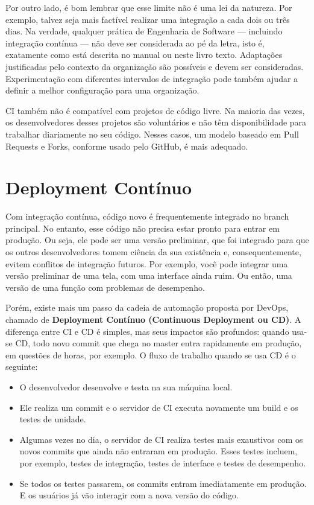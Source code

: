 \documentclass[
  11pt,
  twoside]{book}
\begin{document}
Por outro lado, é bom lembrar que esse limite não é uma lei da natureza.
Por exemplo, talvez seja mais factível realizar uma integração a cada
dois ou três dias. Na verdade, qualquer prática de Engenharia de
Software --- incluindo integração contínua --- não deve ser considerada
ao pé da letra, isto é, exatamente como está descrita no manual ou neste
livro texto. Adaptações justificadas pelo contexto da organização são
possíveis e devem ser consideradas. Experimentação com diferentes
intervalos de integração pode também ajudar a definir a melhor
configuração para uma organização.

CI também não é compatível com projetos de código livre. Na maioria das
vezes, os desenvolvedores desses projetos são voluntários e não têm
disponibilidade para trabalhar diariamente no seu código. Nesses casos,
um modelo baseado em Pull Requests e Forks, conforme usado pelo GitHub,
é mais adequado.

\hypertarget{deployment-contuxednuo}{%
\section{Deployment Contínuo}\label{deployment-contuxednuo}}


Com integração contínua, código novo é frequentemente integrado no
branch principal. No entanto, esse código não precisa estar pronto para
entrar em produção. Ou seja, ele pode ser uma versão preliminar, que foi
integrado para que os outros desenvolvedores tomem ciência da sua
existência e, consequentemente, evitem conflitos de integração futuros.
Por exemplo, você pode integrar uma versão preliminar de uma tela, com
uma interface ainda ruim. Ou então, uma versão de uma função com
problemas de desempenho.

Porém, existe mais um passo da cadeia de automação proposta por DevOps,
chamado de \textbf{Deployment Contínuo (Continuous Deployment ou CD)}. A
diferença entre CI e CD é simples, mas seus impactos são profundos:
quando usa-se CD, todo novo commit que chega no master entra rapidamente
em produção, em questões de horas, por exemplo. O fluxo de trabalho
quando se usa CD é o seguinte:

\begin{itemize}
\item
  O desenvolvedor desenvolve e testa na sua máquina local.
\item
  Ele realiza um commit e o servidor de CI executa novamente um build e
  os testes de unidade.
\item
  Algumas vezes no dia, o servidor de CI realiza testes mais exaustivos
  com os novos commits que ainda não entraram em produção. Esses testes
  incluem, por exemplo, testes de integração, testes de interface e
  testes de desempenho.
\item
  Se todos os testes passarem, os commits entram imediatamente em
  produção. E os usuários já vão interagir com a nova versão do código.
\end{itemize}
\end{document}
